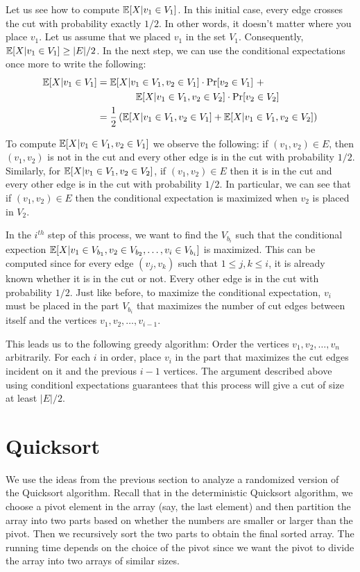 Let us see how to compute $\mathbb{E}[X|v_1\in V_1]$. In this initial case, every edge
crosses the cut with probability exactly $1/2$. In other words, it doesn't
matter where you place $v_1$. Let us assume that we placed $v_1$ in the set
$V_1$. Consequently, $\mathbb{E}[X|v_1 \in V_1] \geq |E|/2$. In the next step, we can
use the conditional expectations once more to write the following:
\begin{align*}
  \mathbb{E}[X|v_1\in V_1] &= \mathbb{E}[X|v_1\in V_1, v_2\in V_1] \cdot \Pr[v_2\in V_1]~ +~ \\
                   &\qquad\qquad  \mathbb{E}[X|v_1\in V_1, v_2\in V_2] \cdot \Pr[v_2\in V_2]\\
 &= \frac{1}{2} \left(\mathbb{E}[X|v_1\in V_1, v_2\in V_1] + \mathbb{E}[X|v_1\in V_1, v_2\in V_2] \right)
\end{align*}

To compute $\mathbb{E}[X| v_1 \in V_1, v_2 \in V_1]$ we observe the following: if
$(v_1, v_2)\in E$, then $(v_1, v_2)$ is not in the cut and every other edge is
in the cut with probability $1/2$. Similarly, for
$\mathbb{E}[X|v_1\in V_1, v_2\in V_2]$, if $(v_1,v_2)\in E$ then it is in the cut and
every other edge is in the cut with probability $1/2$. In particular, we can see
that if $(v_1, v_2)\in E$ then the conditional expectation is maximized when
$v_2$ is placed in $V_2$.

In the $i^{th}$ step of this process, we want to find the $V_{b_i}$ such that
the conditional expection
$\mathbb{E}[X|v_1 \in V_{b_1}, v_2\in V_{b_2}, \ldots, v_i\in V_{b_i}]$ is
maximized. This can be computed since for every edge $(v_j,v_k)$ such that
$1\leq j,k\leq i$, it is already known whether it is in the cut or not. Every
other edge is in the cut with probability $1/2$. Just like before, to maximize
the conditional expectation, $v_i$ must be placed in the part $V_{b_i}$ that
maximizes the number of cut edges between itself and the vertices
$v_1, v_2, \ldots, v_{i-1}$.

This leads us to the following greedy algorithm: Order the vertices
$v_1, v_2, \ldots, v_n$ arbitrarily. For each $i$ in order, place $v_i$ in the
part that maximizes the cut edges incident on it and the previous $i-1$
vertices. The argument described above using conditionl expectations guarantees
that this process will give a cut of size at least $|E|/2$.

\section{Quicksort}
We use the ideas from the previous section to analyze a randomized version of the Quicksort algorithm. Recall that in the deterministic Quicksort algorithm, we choose a pivot element in the array (say, the last element) and then partition the array into two parts based on whether the numbers are smaller or larger than the pivot. Then we recursively sort the two parts to obtain the final sorted array. The running time depends on the choice of the pivot since we want the pivot to divide the array into two arrays of similar sizes. 

